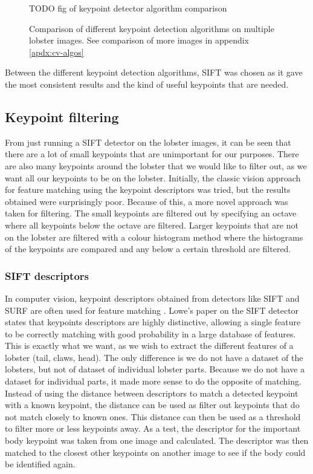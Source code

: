 \begin{figure}[H]
\centering
TODO  fig of keypoint detector algorithm comparison
\caption{Comparison of different keypoint detection algorithms on multiple lobster images. See comparison of more images in appendix \ref{apdx:cv-algos}}
\end{figure}
\noindent

Between the different keypoint detection algorithms, SIFT was chosen as it gave the most consistent results and the kind of useful keypoints that are needed.


\subsection{Keypoint filtering}
From just running a SIFT detector on the lobster images, it can be seen that there are a lot of small keypoints that are unimportant for our purposes. There are also many keypoints around the lobster that we would like to filter out, as we want all our keypoints to be on the lobster. Initially, the classic vision approach for feature matching using the keypoint descriptors \cite{sift} was tried, but the results obtained were surprisingly poor. Because of this, a more novel approach was taken for filtering. The small keypoints are filtered out by specifying an octave where all keypoints below the octave are filtered. Larger keypoints that are not on the lobster are filtered with a colour histogram method where the histograms of the keypoints are compared and any below a certain threshold are filtered.

\subsubsection{SIFT descriptors}
In computer vision, keypoint descriptors obtained from detectors like SIFT and SURF are often used for feature matching \cite{cv-matching}. Lowe's paper \cite{sift} on the SIFT detector states that keypoints descriptors are highly distinctive, allowing a single feature to be correctly matching with good probability in a large database of features. This is exactly what we want, as we wish to extract the different features of a lobster (tail, claws, head). The only difference is we do not have a dataset of the lobsters, but not of dataset of individual lobster parts. 
\n
Because we do not have a dataset for individual parts, it made more sense to do the opposite of matching. Instead of using the distance between descriptors to match a detected keypoint with a known keypoint, the distance can be used as filter out keypoints that do not match closely to known ones. This distance can then be used as a threshold to filter more or less keypoints away. 
\n
As a test, the descriptor for the important body keypoint was taken from one image and calculated. The descriptor was then matched to the closest other keypoints on another image to see if the body could be identified again. 

